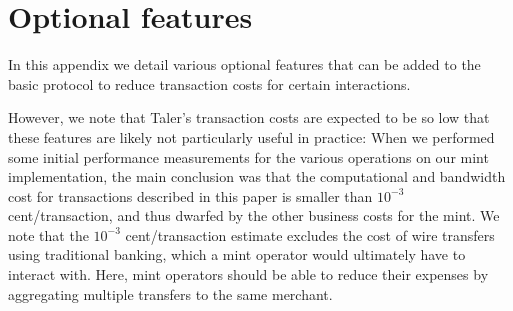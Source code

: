 \documentclass{llncs}
\begin{document}







\newpage
\appendix

\section{Optional features}

In this appendix we detail various optional features that can
be added to the basic protocol to reduce transaction costs for
certain interactions.

However, we note that Taler's transaction costs are expected to be so
low that these features are likely not particularly useful in
practice: When we performed some initial performance measurements for
the various operations on our mint implementation, the main conclusion
was that the computational and bandwidth cost for transactions
described in this paper is smaller than $10^{-3}$ cent/transaction,
and thus dwarfed by the other business costs for the mint.  We note
that the $10^{-3}$ cent/transaction estimate excludes the cost of wire
transfers using traditional banking, which a mint operator would
ultimately have to interact with.  Here, mint operators should be able
to reduce their expenses by aggregating multiple transfers to the same
merchant.
\end{document}
